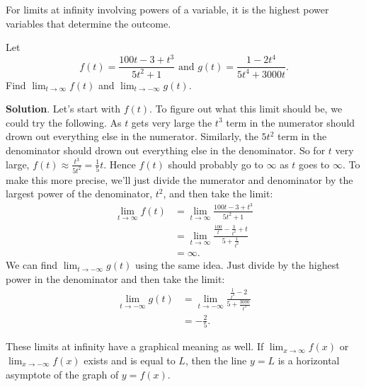 \documentclass[10pt,]{book}
\theoremstyle{ptxplainnotitle}
\theoremstyle{ptxplaintitle}
\theoremstyle{ptxplainnotitle}
\theoremstyle{ptxplaintitle}
\theoremstyle{ptxplainnotitle}
\theoremstyle{ptxplaintitle}
\theoremstyle{ptxdefinitionnotitle}
\theoremstyle{ptxdefinitiontitle}
\theoremstyle{ptxdefinitionnotitle}
\theoremstyle{ptxdefinitiontitle}
\theoremstyle{ptxdefinitionnotitle}
\theoremstyle{ptxdefinitiontitle}
\theoremstyle{ptxdefinitionnotitle}
\theoremstyle{ptxdefinitiontitle}
\theoremstyle{ptxdefinitionnotitle}
\theoremstyle{ptxdefinitiontitle}
\numberwithin{equation}{section}
\begin{document}
\hypertarget{p-67}{}%
For limits at infinity involving powers of a variable, it is the highest power variables that determine the outcome.%
\begin{example}\label{example-limit-at-infinity-of-a-rational-function}
\hypertarget{p-68}{}%
Let%
\begin{equation*}
f(t) = \frac{100t - 3 + t^{3}}{5t^{2}+1}\text{ and } g(t) = \frac{1-2t^{4}}{5t^{4}+3000t}.
\end{equation*}
Find \(\lim_{t\to\infty} f(t)\) and \(\lim_{t\to-\infty}g(t)\).%
\par\smallskip%
\noindent\textbf{Solution}.\hypertarget{solution-14}{}\quad%
\hypertarget{p-69}{}%
Let's start with \(f(t)\). To figure out what this limit should be, we could try the following. As \(t\) gets very large the \(t^{3}\) term in the numerator should drown out everything else in the numerator. Similarly, the \(5t^{2}\) term in the denominator should drown out everything else in the denominator. So for \(t\) very large, \(f(t)\approx\frac{t^{3}}{5t^{2}} = \frac{1}{5}t\). Hence \(f(t)\) should probably go to \(\infty\) as \(t\) goes to \(\infty\). To make this more precise, we'll just divide the numerator and denominator by the largest power of the denominator, \(t^{2}\), and then take the limit:%
%
\begin{align*}
\lim_{t\to\infty}f(t) & = \lim_{t\to\infty}\frac{100t-3+t^{3}}{5t^{2}+1} \\
& = \lim_{t\to\infty}\frac{\frac{100}{t} - \frac{3}{t^{2}}+t}{5+\frac{1}{t^{2}}} \\
& = \infty. 
\end{align*}
\hypertarget{p-70}{}%
We can find \(\lim_{t\to-\infty}g(t)\) using the same idea. Just divide by the highest power in the denominator and then take the limit:%
%
\begin{align*}
\lim_{t\to-\infty}g(t) & = \lim_{t\to-\infty}\frac{\frac{1}{t^{4}}-2}{5+\frac{3000}{t^{3}}} \\
& = -\frac{2}{5}. 
\end{align*}
\end{example}
\hypertarget{p-71}{}%
These limits at infinity have a graphical meaning as well. If \(\lim_{x\to\infty}f(x)\) or \(\lim_{x\to-\infty}f(x)\) exists and is equal to \(L\), then the line \(y=L\) is a horizontal asymptote of the graph of \(y=f(x)\).%
\end{document}
